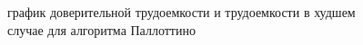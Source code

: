 \documentclass[a4paper,fontsize=14pt]{article}
\begin{document}
\begin{figure}[!]
	\caption{график доверительной трудоемкости и трудоемкости в худшем случае для алгоритма Паллоттино}
	\label{fig:comparison_complexities}
\end{figure}

\newpage
\end{document}
